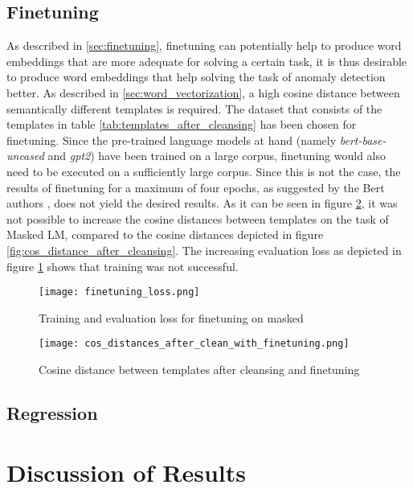 \subsection{Finetuning}
As described in \ref{sec:finetuning}, finetuning can potentially help to produce word embeddings that are more adequate for solving a certain task, it is thus desirable to produce word embeddings that help solving the task of anomaly detection better. As described in \ref{sec:word_vectorization}, a high cosine distance between semantically different templates is required. The dataset that consists of the templates in table \ref{tab:templates_after_cleansing} has been chosen for finetuning. Since the pre-trained language models at hand (namely \textit{bert-base-uncased} and \textit{gpt2}) have been trained on a large corpus, finetuning would also need to be executed on a sufficiently large corpus. Since this is not the case, the results of finetuning for a maximum of four epochs, as suggested by the Bert authors \cite{devlin2018bert}, does not yield the desired results. As it can be seen in figure \ref{fig:cos_distance_finetuning}, it was not possible to increase the cosine distances between templates on the task of Masked LM, compared to the cosine distances depicted in figure \ref{fig:cos_distance_after_cleansing}. The increasing evaluation loss as depicted in figure \ref{fig:finetuning_loss} shows that training was not successful.

\begin{figure}[H]
  \centering
  \texttt{[image: finetuning\_loss.png]}\\
  \caption{Training and evaluation loss for finetuning on masked }
  \label{fig:finetuning_loss}
\end{figure}

\begin{figure}[h]
  \centering
  \texttt{[image: cos\_distances\_after\_clean\_with\_finetuning.png]}\\
  \caption{Cosine distance between templates after cleansing and finetuning}
  \label{fig:cos_distance_finetuning}
\end{figure}


\subsection{Regression}

\section{Discussion of Results}
